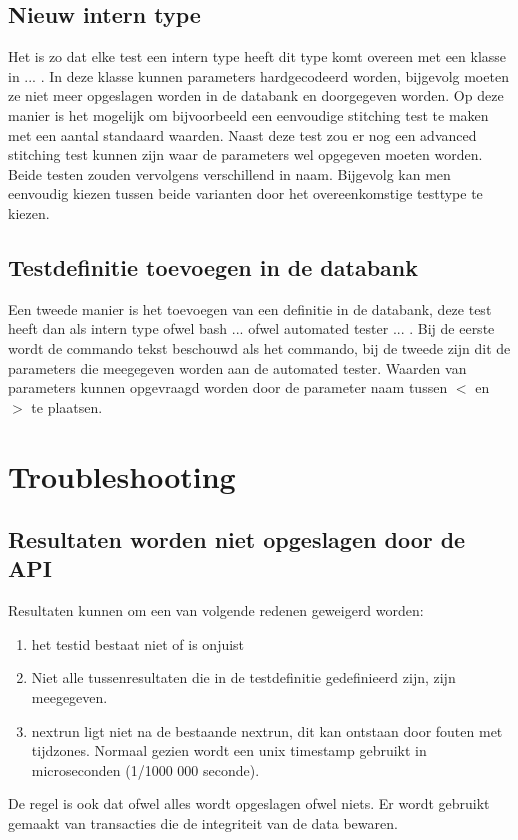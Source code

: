 \subsection{Nieuw intern type}
Het is zo dat elke test een intern type heeft dit type komt overeen met een klasse in ... . In deze klasse kunnen parameters hardgecodeerd worden, bijgevolg moeten ze niet meer opgeslagen worden in de databank en doorgegeven worden. Op deze manier is het mogelijk om bijvoorbeeld een eenvoudige stitching test te maken met een aantal standaard waarden. Naast deze test zou er nog een advanced stitching test kunnen zijn waar de parameters wel opgegeven moeten worden. Beide testen zouden vervolgens verschillend in naam. Bijgevolg kan men eenvoudig kiezen tussen beide varianten door het overeenkomstige testtype te kiezen.

\subsection{Testdefinitie toevoegen in de databank}
\npar
Een tweede manier is het toevoegen van een definitie in de databank, deze test heeft dan als intern type ofwel bash ... ofwel automated tester ... . Bij de eerste wordt de commando tekst beschouwd als het commando, bij de tweede zijn dit de parameters die meegegeven worden aan de automated tester. Waarden van parameters kunnen opgevraagd worden door de parameter naam tussen $<$ en $>$ te plaatsen.

\section{Troubleshooting}
\subsection{Resultaten worden niet opgeslagen door de API}
\npar
Resultaten kunnen om een van volgende redenen geweigerd worden:
\begin{enumerate}
\item het testid bestaat niet of is onjuist
\item Niet alle tussenresultaten die in de testdefinitie gedefinieerd zijn, zijn meegegeven. 
\item nextrun ligt niet na de bestaande nextrun, dit kan ontstaan door fouten met tijdzones. Normaal gezien wordt een unix timestamp gebruikt in microseconden (1/1000 000 seconde).
\end{enumerate}
De regel is ook dat ofwel alles wordt opgeslagen ofwel niets. Er wordt gebruikt gemaakt van transacties die de integriteit van de data bewaren.
